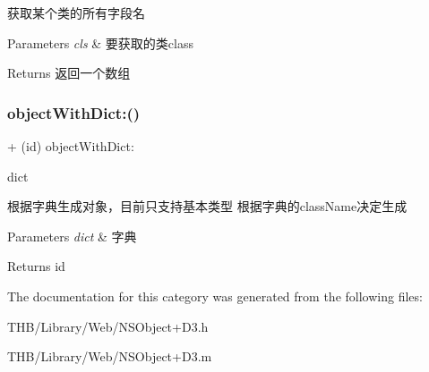 获取某个类的所有字段名


\begin{DoxyParams}{Parameters}
{\em cls} & 要获取的类class\\
\hline
\end{DoxyParams}
\begin{DoxyReturn}{Returns}
返回一个数组 
\end{DoxyReturn}
\mbox{\label{category_n_s_object_07_d3_08_ad95c24f70f30ba209b675410a60a5eab}} 
\subsubsection{\texorpdfstring{object\+With\+Dict\+:()}{objectWithDict:()}}
{\footnotesize\ttfamily + (id) object\+With\+Dict\+: \begin{DoxyParamCaption}\item[{(N\+S\+Dictionary$\ast$)}]{dict }\end{DoxyParamCaption}}

根据字典生成对象，目前只支持基本类型 根据字典的class\+Name决定生成 
\begin{DoxyParams}{Parameters}
{\em dict} & 字典\\
\hline
\end{DoxyParams}
\begin{DoxyReturn}{Returns}
id 
\end{DoxyReturn}


The documentation for this category was generated from the following files\+:\begin{DoxyCompactItemize}
\item 
T\+H\+B/\+Library/\+Web/N\+S\+Object+\+D3.\+h\item 
T\+H\+B/\+Library/\+Web/N\+S\+Object+\+D3.\+m\end{DoxyCompactItemize}
